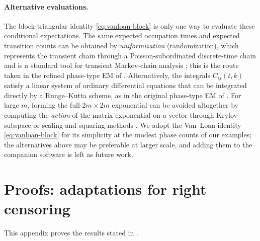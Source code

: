 \documentclass{article}
\begin{document}
\paragraph{Alternative evaluations.} The block-triangular identity \eqref{eq:vanloan-block} is only one way to evaluate these conditional expectations. The same expected occupation times and expected transition counts can be obtained by \emph{uniformization} (randomization), which represents the transient chain through a Poisson-subordinated discrete-time chain and is a standard tool for transient Markov-chain analysis \citep{grassmann_1977, reibman_trivedi_1988}; this is the route taken in the refined phase-type EM of \citet{okamura_2011}. Alternatively, the integrals $C_{ij}(t,k)$ satisfy a linear system of ordinary differential equations that can be integrated directly by a Runge--Kutta scheme, as in the original phase-type EM of \citet{Asmussen1996FittingPD}. For large $m$, forming the full $2m\times2m$ exponential can be avoided altogether by computing the \emph{action} of the matrix exponential on a vector through Krylov-subspace or scaling-and-squaring methods \citep{sidje_1998, almohy_higham_2011}. We adopt the Van~Loan identity \eqref{eq:vanloan-block} for its simplicity at the modest phase counts of our examples; the alternatives above may be preferable at larger scale, and adding them to the companion software is left as future work.

\section{Proofs: adaptations for right censoring}
\label{app:proofs-cens}
\label{app:e-step-censored}

This appendix proves the results stated in .
\end{document}
